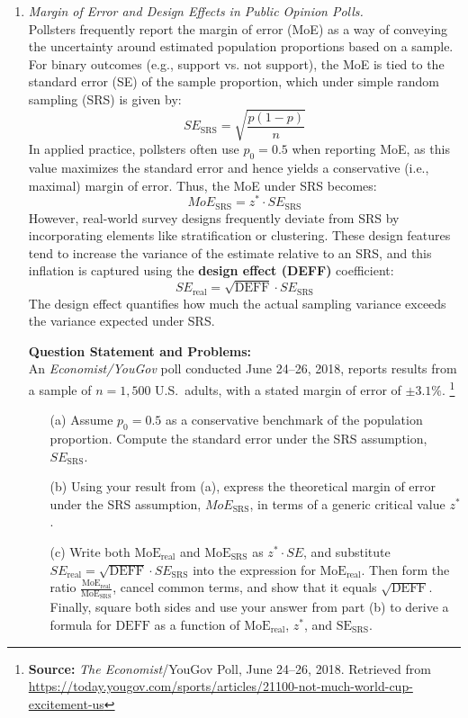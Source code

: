\documentclass{article}
\begin{document}
\begin{enumerate}
\item  \emph{Margin of Error and Design Effects in Public Opinion Polls.}\\
    Pollsters frequently report the margin of error (MoE) as a way of conveying the uncertainty around estimated population proportions based on a sample. For binary outcomes (e.g., support vs. not support), the MoE is tied to the standard error (SE) of the sample proportion, which under simple random sampling (SRS) is given by:
    \[
    SE_{\text{SRS}} = \sqrt{\frac{p(1 - p)}{n}}
    \]
    In applied practice, pollsters often use $p_0 = 0.5$ when reporting MoE, as this value maximizes the standard error and hence yields a conservative (i.e., maximal) margin of error. Thus, the MoE under SRS becomes:
    \[
    MoE_{\text{SRS}} = z^* \cdot SE_{\text{SRS}}
    \]
    However, real-world survey designs frequently deviate from SRS by incorporating elements like stratification or clustering. These design features tend to increase the variance of the estimate relative to an SRS, and this inflation is captured using the \textbf{design effect (DEFF)} coefficient:
    \[
    SE_{\text{real}} = \sqrt{\text{DEFF}} \cdot SE_{\text{SRS}}
    \]
    The design effect quantifies how much the actual sampling variance exceeds the variance expected under SRS.

    \noindent\textbf{Question Statement and Problems:} \\
    An \emph{Economist/YouGov} poll conducted June 24–26, 2018, reports results from a sample of $n = 1{,}500$ U.S.\ adults, with a stated margin of error of $\pm 3.1\%$.%
    \footnote{\textbf{Source:} \emph{The Economist}/YouGov Poll, June 24–26, 2018. Retrieved from \url{https://today.yougov.com/sports/articles/21100-not-much-world-cup-excitement-us}}

    \begin{enumerate}
        \item[(a)] Assume $p_0 = 0.5$ as a conservative benchmark of the population proportion. Compute the standard error under the SRS assumption, $SE_{\text{SRS}}$.

        \item[(b)] Using your result from (a), express the theoretical margin of error under the SRS assumption, $MoE_{\text{SRS}}$, in terms of a generic critical value $z^*$.

        \item[(c)] Write both \( \text{MoE}_{\text{real}} \) and \( \text{MoE}_{\text{SRS}} \) as \( z^* \cdot SE \), and substitute \( SE_{\text{real}} = \sqrt{\text{DEFF}} \cdot SE_{\text{SRS}} \) into the expression for \( \text{MoE}_{\text{real}} \). Then form the ratio \( \frac{\text{MoE}_{\text{real}}}{\text{MoE}_{\text{SRS}}} \), cancel common terms, and show that it equals \( \sqrt{\text{DEFF}} \). Finally, square both sides and use your answer from part (b) to derive a formula for \( \text{DEFF} \) as a function of $\text{MoE}_{\text{real}}$, $z^*$, and $\text{SE}_{\text{SRS}}$.


\end{enumerate}
\end{enumerate}
\end{document}
